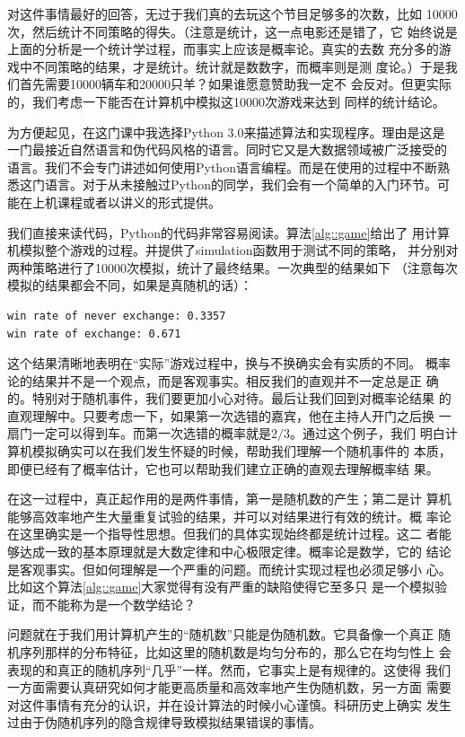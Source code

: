 对这件事情最好的回答，无过于我们真的去玩这个节目足够多的次数，比如
10000次，然后统计不同策略的得失。（注意是统计，这一点电影还是错了，它
  始终说是上面的分析是一个统计学过程，而事实上应该是概率论。真实的去数
  充分多的游戏中不同策略的结果，才是统计。统计就是数数字，而概率则是测
  度论。）于是我们首先需要10000辆车和20000只羊？如果谁愿意赞助我一定不
会反对。但更实际的，我们考虑一下能否在计算机中模拟这10000次游戏来达到
同样的统计结论。

为方便起见，在这门课中我选择Python 3.0来描述算法和实现程序。理由是这是
一门最接近自然语言和伪代码风格的语言。同时它又是大数据领域被广泛接受的
语言。我们不会专门讲述如何使用Python语言编程。而是在使用的过程中不断熟
悉这门语言。对于从未接触过Python的同学，我们会有一个简单的入门环节。可
能在上机课程或者以讲义的形式提供。

我们直接来读代码，Python的代码非常容易阅读。算法\ref{alg::game}给出了
用计算机模拟整个游戏的过程。并提供了simulation函数用于测试不同的策略，
并分别对两种策略进行了10000次模拟，统计了最终结果。一次典型的结果如下
（注意每次模拟的结果都会不同，如果是真随机的话）：

\begin{lstlisting}
win rate of never exchange: 0.3357
win rate of exchange: 0.671
\end{lstlisting}

这个结果清晰地表明在``实际''游戏过程中，换与不换确实会有实质的不同。
概率论的结果并不是一个观点，而是客观事实。相反我们的直观并不一定总是正
确的。特别对于随机事件，我们要更加小心对待。最后让我们回到对概率论结果
的直观理解中。只要考虑一下，如果第一次选错的嘉宾，他在主持人开门之后换
一扇门一定可以得到车。而第一次选错的概率就是$2/3$。通过这个例子，我们
明白计算机模拟确实可以在我们发生怀疑的时候，帮助我们理解一个随机事件的
本质，即便已经有了概率估计，它也可以帮助我们建立正确的直观去理解概率结
果。

在这一过程中，真正起作用的是两件事情，第一是随机数的产生；第二是计
算机能够高效率地产生大量重复试验的结果，并可以对结果进行有效的统计。概
率论在这里确实是一个指导性思想。但我们的具体实现始终都是统计过程。这二
者能够达成一致的基本原理就是大数定律和中心极限定律。概率论是数学，它的
结论是客观事实。但如何理解是一个严重的问题。而统计实现过程也必须足够小
心。比如这个算法\ref{alg::game}大家觉得有没有严重的缺陷使得它至多只
是一个模拟验证，而不能称为是一个数学结论？

问题就在于我们用计算机产生的``随机数''只能是伪随机数。它具备像一个真正
随机序列那样的分布特征，比如这里的随机数是均匀分布的，那么它在均匀性上
会表现的和真正的随机序列``几乎''一样。然而，它事实上是有规律的。这使得
我们一方面需要认真研究如何才能更高质量和高效率地产生伪随机数，另一方面
需要对这件事情有充分的认识，并在设计算法的时候小心谨慎。科研历史上确实
发生过由于伪随机序列的隐含规律导致模拟结果错误的事情。

